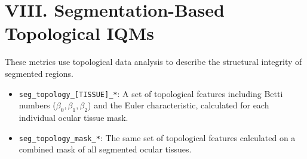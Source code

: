 \section*{VIII. Segmentation-Based Topological IQMs}
These metrics use topological data analysis to describe the structural integrity of segmented regions.
\begin{itemize}
    \item \texttt{seg\_topology\_[TISSUE]\_*}: A set of topological features including Betti numbers ($\beta_0, \beta_1, \beta_2$) and the Euler characteristic, calculated for each individual ocular tissue mask.
    \item \texttt{seg\_topology\_mask\_*}: The same set of topological features calculated on a combined mask of all segmented ocular tissues.
\end{itemize}
